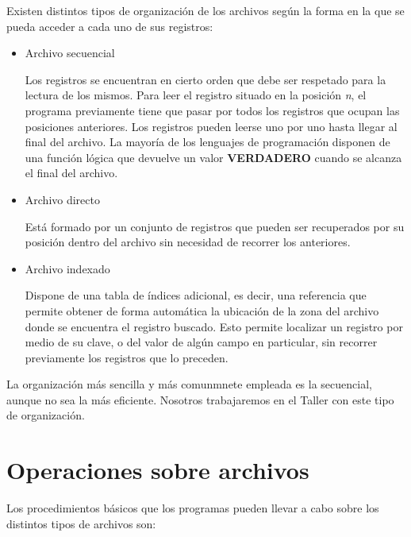 \documentclass[
]{book}
\begin{document}
Existen distintos tipos de organización de los archivos según la forma en la que se pueda acceder a cada uno de sus registros:

\begin{itemize}
\item
  Archivo secuencial

  Los registros se encuentran en cierto orden que debe ser respetado para la lectura de los mismos. Para leer el registro situado en la posición \emph{n}, el programa previamente tiene que pasar por todos los registros que ocupan las posiciones anteriores. Los registros pueden leerse uno por uno hasta llegar al final del archivo. La mayoría de los lenguajes de programación disponen de una función lógica que devuelve un valor \textbf{VERDADERO} cuando se alcanza el final del archivo.
\item
  Archivo directo

  Está formado por un conjunto de registros que pueden ser recuperados por su posición dentro del archivo sin necesidad de recorrer los anteriores.
\item
  Archivo indexado

  Dispone de una tabla de índices adicional, es decir, una referencia que permite obtener de forma automática la ubicación de la zona del archivo donde se encuentra el registro buscado. Esto permite localizar un registro por medio de su clave, o del valor de algún campo en particular, sin recorrer previamente los registros que lo preceden.
\end{itemize}

La organización más sencilla y más comunmnete empleada es la secuencial, aunque no sea la más eficiente. Nosotros trabajaremos en el Taller con este tipo de organización.

\hypertarget{operaciones-sobre-archivos}{%
\section{Operaciones sobre archivos}\label{operaciones-sobre-archivos}}

Los procedimientos básicos que los programas pueden llevar a cabo sobre los distintos tipos de archivos son:
\end{document}
